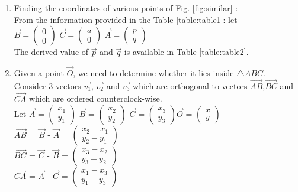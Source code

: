 \begin{enumerate}

\item
Finding the coordinates of various points of Fig. \ref{fig:similar} :\\
From the information provided in the Table \ref{table:table1}: let\\
    \quad $ \vec{B}= \begin{pmatrix}0\\0\end{pmatrix}$
    \quad $\vec{C}=\begin{pmatrix}a\\0\end{pmatrix}$
    \quad $\vec{A}=\begin{pmatrix}p\\q\end{pmatrix}$\\The derived value of $\vec{p}$ and $\vec{q}$ is available in Table \ref{table:table2}.
\item Given a point $\vec{O}$, we need to determine whether it lies inside $\triangle ABC$. Consider 3 vectors $\vec{v_1}$, $\vec{v_2}$ and $\vec{v_3}$ which are orthogonal to vectors $\vec{AB}$,$\vec{BC}$ and $\vec{CA}$ which are ordered counterclock-wise.\\
Let $\vec{A}$ = $\begin{pmatrix}x_1\\y_1\end{pmatrix}$ \quad $\vec{B}$ = $\begin{pmatrix}x_2\\y_2\end{pmatrix}$ \quad $\vec{C}$ = $\begin{pmatrix}x_3\\y_3\end{pmatrix}$\quad $\vec{O}$ = $\begin{pmatrix}x\\y\end{pmatrix}$\\
$\vec{AB}$ = $\vec{B}$ - $\vec{A}$ = $\begin{pmatrix}x_2-x_1\\y_2-y_1\end{pmatrix}$\\
$\vec{BC}$ = $\vec{C}$ - $\vec{B}$ = $\begin{pmatrix}x_3-x_2\\y_3-y_2\end{pmatrix}$\\
$\vec{CA}$ = $\vec{A}$ - $\vec{C}$ = $\begin{pmatrix}x_1-x_3\\y_1-y_3\end{pmatrix}$\\


\end{enumerate}
